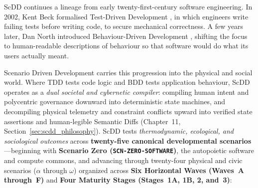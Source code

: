 ScDD continues a lineage from early twenty-first-century software engineering. In 2002, Kent Beck formalised Test-Driven Development \parencite{beck2002test}, in which engineers write failing tests before writing code, to secure mechanical correctness. A few years later, Dan North introduced Behaviour-Driven Development \parencite{north2006introducing}, shifting the focus to human-readable descriptions of behaviour so that software would do what its users actually meant.

Scenario Driven Development carries this progression into the physical and social world. Where TDD tests code logic and BDD tests application behaviour, ScDD operates as a \textit{dual societal and cybernetic compiler}: compiling human intent and polycentric governance downward into deterministic state machines, and decompiling physical telemetry and constraint conflicts upward into verified state assertions and human-legible Semantic Diffs (Chapter~11, Section~\ref{sec:scdd_philosophy}). ScDD tests \textit{thermodynamic, ecological, and sociological outcomes} across \textbf{twenty-five canonical developmental scenarios}---beginning with \textbf{Scenario Zero (\texttt{SCN-ZERO-SOFTWARE})}, the autopoietic software and compute commons, and advancing through twenty-four physical and civic scenarios ($\alpha$ through $\omega$) organized across \textbf{Six Horizontal Waves (Waves~A through~F)} and \textbf{Four Maturity Stages (Stages~1A, 1B, 2, and~3)}:
